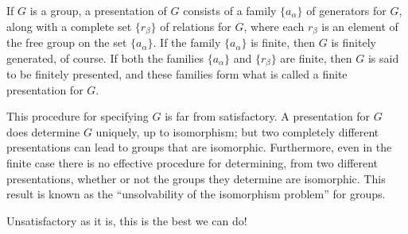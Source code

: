 \begin{definition}
If \(G\) is a group, a presentation of \(G\) consists of a family \(\{ a_{\alpha }\}\) of generators for \(G\), along with a complete set \(\{ r_{\beta }\}\) of relations for \(G\), where each \(r_{\beta }\) is an element of the free group on the set \(\{ a_{\alpha }\}\). If the family \(\{ a_{\alpha }\}\) is finite, then \(G\) is finitely generated, of course. If both the families \(\{ a_{\alpha }\}\) and \(\{ r_{\beta }\}\) are finite, then \(G\) is said to be finitely presented, and these families form what is called a finite presentation for \(G\).
\end{definition}

This procedure for specifying \(G\) is far from satisfactory. A presentation for \(G\) does determine \(G\) uniquely, up to isomorphism; but two completely different presentations can lead to groups that are isomorphic. Furthermore, even in the finite case there is no effective procedure for determining, from two different presentations, whether or not the groups they determine are isomorphic. This result is known as the ``unsolvability of the isomorphism problem'' for groups.

Unsatisfactory as it is, this is the best we can do!


